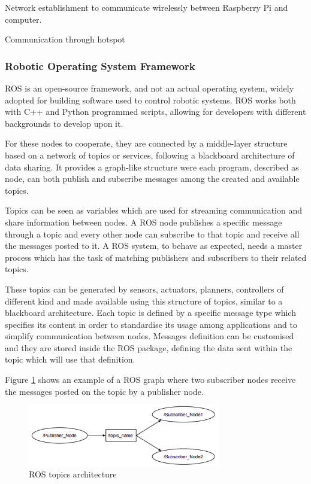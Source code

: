 Network establishment to communicate wirelessly between Raspberry Pi and computer.

Communication through hotspot




\subsubsection{Robotic Operating System Framework}
\label{ssec:ros}
\noindent \Gls{ROS}\cite{288} is an open-source framework, and not an actual operating system, widely adopted for building software used to control robotic systems.
\Gls{ROS} works both with C++ and Python programmed scripts, allowing for developers with different backgrounds to develop upon it.


For these nodes to cooperate, they are connected by a middle-layer structure based on a network of topics or services, following a blackboard architecture of data sharing.
It provides a graph-like structure were each program, described as node, can both publish and subscribe messages among the created and available topics.

Topics can be seen as variables which are used for streaming communication and share information between nodes.
A \Gls{ROS} node publishes a specific message through a topic and every other node can subscribe to that topic and receive all the messages posted to it.
A \Gls{ROS} system, to behave as expected, needs a master process which has the task of matching publishers and subscribers to their related topics.

These topics can be generated by sensors, actuators, planners, controllers of different kind and made available using this structure of topics, similar to a blackboard architecture.
Each topic is defined by a specific message type which specifies its content in order to standardise its usage among applications and to simplify communication between nodes.
Messages definition can be customised and they are stored inside the \Gls{ROS} package, defining the data sent within the topic which will use that definition.

Figure \ref{fig:ros-topic} shows an example of a \Gls{ROS} graph where two subscriber nodes receive the messages posted on the topic by a publisher node.

\begin{figure}[!ht]
	\begin{center}
		\includegraphics[width=0.75\textwidth]{Images/2-Background/ROSTopic-2021-04-22 10-51-37.png}
	\end{center}
	\caption{\Gls{ROS} topics architecture}%
	\label{fig:ros-topic}
\end{figure}

